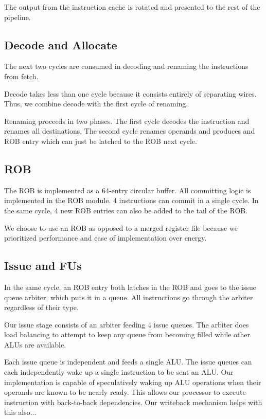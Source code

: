 \documentclass{article}
\begin{document}
The output from the instruction cache is rotated and presented to the rest of
the pipeline.

\subsection{Decode and Allocate}

The next two cycles are consumed in decoding and renaming the instructions from
fetch.

Decode takes less than one cycle because it consists entirely of separating
wires. Thus, we combine decode with the first cycle of renaming.

Renaming proceeds in two phases. The first cycle decodes the instruction and
renames all destinations. The second cycle renames operands and produces and ROB
entry which can just be latched to the ROB next cycle.

\subsection{ROB}

The ROB is implemented as a 64-entry circular buffer. All committing logic is
implemented in the ROB module. 4 instructions can commit in a single cycle. In
the same cycle, 4 new ROB entries can also be added to the tail of the ROB.

We choose to use an ROB as opposed to a merged register file because we
prioritized performance and ease of implementation over energy.

\subsection{Issue and FUs}

In the same cycle, an ROB entry both latches in the ROB and goes to the issue
queue arbiter, which puts it in a queue. All instructions go through the arbiter
regardless of their type.

Our issue stage consists of an arbiter feeding 4 issue queues.
The arbiter does load balancing to attempt to keep any queue from becoming
filled while other ALUs are available.

Each issue queue is independent and feeds a single ALU. The issue queues can
each independently wake up a single instruction to be sent an ALU. Our
implementation is capable of speculatively waking up ALU operations when their
operands are known to be nearly ready. This allows our processor to execute
instruction with back-to-back dependencies. Our writeback mechanism helps with
this also...
\end{document}
